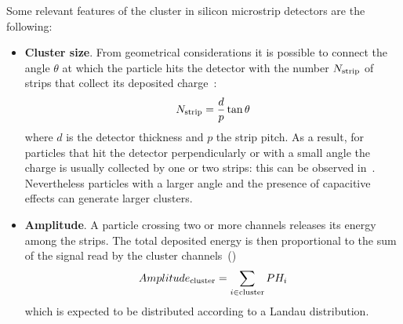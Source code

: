Some relevant features of the cluster in silicon microstrip detectors are the following:
\begin{itemize}
\item {\bf Cluster size}. From geometrical considerations it is possible to
  connect the angle $\theta$ at which the particle hits the detector with the
  number $N_{\rm strip}$ of strips that collect its deposited charge~\cite{Turchetta:1993vu}:
\begin{equation}
N_{\rm strip} = \frac{d}{p}\tan{\theta}
\end{equation}
where $d$ is the detector thickness and $p$ the strip pitch. As a result, for
particles that hit the detector perpendicularly or with a small angle the
charge is usually collected by one or two strips: this can be observed in~.
Nevertheless particles with a larger angle and the presence of capacitive effects can generate larger clusters.
\item {\bf Amplitude}. A particle crossing two or more channels releases its
  energy among the strips. The total deposited energy is then proportional to the sum
  of the signal read by the cluster channels~()
\begin{equation}
Amplitude_{\rm cluster} = \sum_{i\in {\rm cluster}} PH_i
\end{equation}\label{eq:cluster_amplitude}
which is expected to be distributed according to a Landau distribution.
\begin{figure}[!htbp]
  \centering 
  \\

\end{figure}
\end{itemize}
